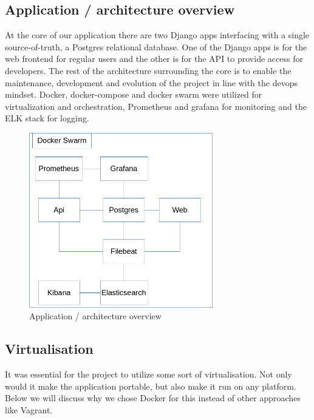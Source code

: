 \documentclass[12pt]{article}
\begin{document}
\subsection{Application / architecture overview}

At the core of our application there are two Django apps interfacing with a single source-of-truth, a Postgres relational database. One of the Django apps is for the web frontend for regular users and the other is for the API to provide access for developers. The rest of the architecture surrounding the core is to enable the maintenance, development and evolution of the project in line with the devops mindset. Docker, docker-compose and docker swarm were utilized for virtualization and orchestration, Prometheus and grafana for monitoring and the ELK stack for logging. 
\begin{figure}[h!]
    \centering
    \includegraphics[width=8cm]{figures/structure.png}
    \caption{Application / architecture overview}
    \label{fig:structure}
\end{figure}

\subsection{Virtualisation}
It was essential for the project to utilize some sort of virtualisation. Not only would it make the application portable, but also make it run on any platform. Below we will discuss why we chose Docker for this instead of other approaches like Vagrant. 
\end{document}
